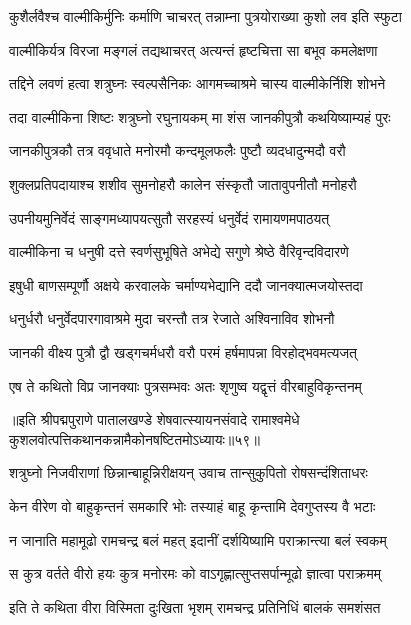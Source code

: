 \twolineshloka
{कुशैर्लवैश्च वाल्मीकिर्मुनिः कर्माणि चाचरत्}
{तन्नाम्ना पुत्रयोराख्या कुशो लव इति स्फुटा}%

\twolineshloka
{वाल्मीकिर्यत्र विरजा मङ्गलं तद्यथाचरत्}
{अत्यन्तं हृष्टचित्ता सा बभूव कमलेक्षणा}%

\twolineshloka
{तद्दिने लवणं हत्वा शत्रुघ्नः स्वल्पसैनिकः}
{आगमच्चाश्रमे चास्य वाल्मीकेर्निशि शोभने}%

\twolineshloka
{तदा वाल्मीकिना शिष्टः शत्रुघ्नो रघुनायकम्}
{मा शंस जानकीपुत्रौ कथयिष्याम्यहं पुरः}%

\twolineshloka
{जानकीपुत्रकौ तत्र ववृधाते मनोरमौ}
{कन्दमूलफलैः पुष्टौ व्यदधादुन्मदौ वरौ}%

\twolineshloka
{शुक्लप्रतिपदायाश्च शशीव सुमनोहरौ}
{कालेन संस्कृतौ जातावुपनीतौ मनोहरौ}%

\twolineshloka
{उपनीयमुनिर्वेदं साङ्गमध्यापयत्सुतौ}
{सरहस्यं धनुर्वेदं रामायणमपाठयत्}%

\twolineshloka
{वाल्मीकिना च धनुषी दत्ते स्वर्णसुभूषिते}
{अभेद्ये सगुणे श्रेष्ठे वैरिवृन्दविदारणे}%

\twolineshloka
{इषुधी बाणसम्पूर्णौ अक्षये करवालके}
{चर्माण्यभेद्यानि ददौ जानक्यात्मजयोस्तदा}%

\twolineshloka
{धनुर्धरौ धनुर्वेदपारगावाश्रमे मुदा}
{चरन्तौ तत्र रेजाते अश्विनाविव शोभनौ}%

\twolineshloka
{जानकी वीक्ष्य पुत्रौ द्वौ खड्गचर्मधरौ वरौ}
{परमं हर्षमापन्ना विरहोद्भवमत्यजत्}%

\twolineshloka
{एष ते कथितो विप्र जानक्याः पुत्रसम्भवः}
{अतः शृणुष्व यद्वृत्तं वीरबाहुविकृन्तनम्}%

॥इति श्रीपद्मपुराणे पातालखण्डे शेषवात्स्यायनसंवादे रामाश्वमेधे कुशलवोत्पत्तिकथानकन्नामैकोनषष्टितमोऽध्यायः॥५९॥



\twolineshloka
{शत्रुघ्नो निजवीराणां छिन्नान्बाहून्निरीक्षयन्}
{उवाच तान्सुकुपितो रोषसन्दंशिताधरः}%

\twolineshloka
{केन वीरेण वो बाहुकृन्तनं समकारि भोः}
{तस्याहं बाहू कृन्तामि देवगुप्तस्य वै भटाः}%

\twolineshloka
{न जानाति महामूढो रामचन्द्र बलं महत्}
{इदानीं दर्शयिष्यामि पराक्रान्त्या बलं स्वकम्}%

\twolineshloka
{स कुत्र वर्तते वीरो हयः कुत्र मनोरमः}
{को वाऽगृह्णात्सुप्तसर्पान्मूढो ज्ञात्वा पराक्रमम्}%

\twolineshloka
{इति ते कथिता वीरा विस्मिता दुःखिता भृशम्}
{रामचन्द्र प्रतिनिधिं बालकं समशंसत}%

